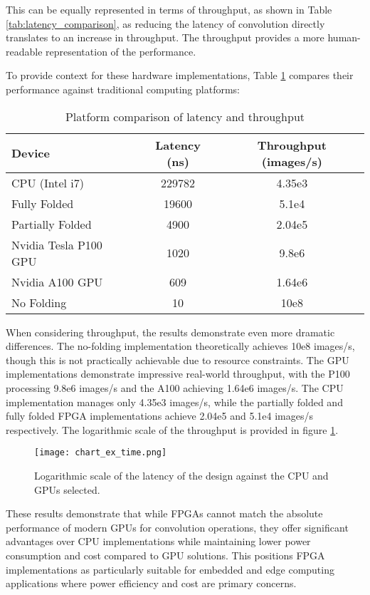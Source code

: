 This can be equally represented in terms of throughput, as shown in Table \ref{tab:latency_comparison}, as reducing the latency of convolution directly translates to an increase in throughput.
The throughput provides a more human-readable representation of the performance.

To provide context for these hardware implementations, Table \ref{tab:platform_comparison} compares their performance against traditional computing platforms:

\begin{table}[h!]
    \centering
    \caption{Platform comparison of latency and throughput}
    \label{tab:platform_comparison}
    \begin{tabular}{lcc}
        \toprule
        Device & Latency (ns) & Throughput (images/s) \\
        \midrule
        CPU (Intel i7) & 229782 & 4.35e3 \\
        Fully Folded & 19600 & 5.1e4 \\
        Partially Folded & 4900 & 2.04e5 \\
        Nvidia Tesla P100 GPU & 1020 & 9.8e6 \\
        Nvidia A100 GPU & 609 & 1.64e6 \\
        No Folding & 10 & 10e8 \\
        \bottomrule
    \end{tabular}
\end{table}

When considering throughput, the results demonstrate even more dramatic differences. 
The no-folding implementation theoretically achieves 10e8 images/s, though this is not practically achievable due to resource constraints. The GPU implementations demonstrate impressive real-world throughput, with the P100 processing 9.8e6 images/s and the A100 achieving 1.64e6 images/s. The CPU implementation manages only 4.35e3 images/s, while the partially folded and fully folded FPGA implementations achieve 2.04e5 and 5.1e4 images/s respectively.
The logarithmic scale of the throughput is provided in figure \ref{fig:throughput_comparison}.

\begin{figure}[h]
    \centering
    \texttt{[image: chart\_ex\_time.png]}
    \caption{Logarithmic scale of the latency of the design against the CPU and GPUs selected.}
    \label{fig:throughput_comparison}
\end{figure}
These results demonstrate that while FPGAs cannot match the absolute performance of modern GPUs for convolution operations, they offer significant advantages over CPU implementations while maintaining lower power consumption and cost compared to GPU solutions. This positions FPGA implementations as particularly suitable for embedded and edge computing applications where power efficiency and cost are primary concerns.


